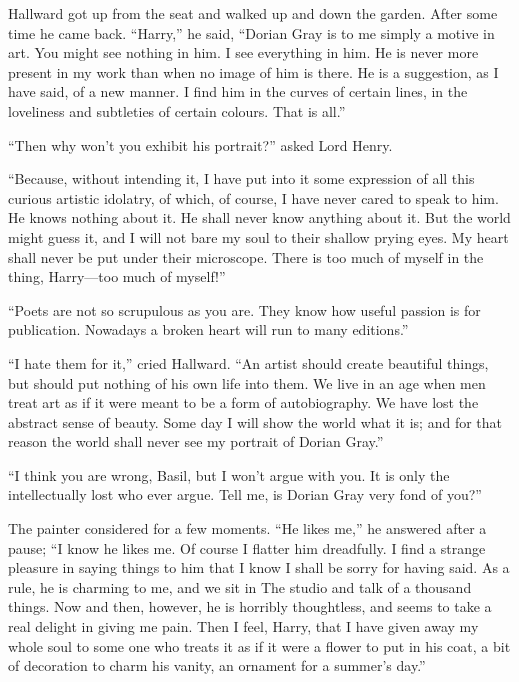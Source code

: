 Hallward got up from the seat and walked up and down the garden. After some time he came back. “Harry,” he said, “Dorian Gray is to me simply a motive in art. You might see nothing in him. I see everything in him. He is never more present in my work than when no image of him is there. He is a suggestion, as I have said, of a new manner. I find him in the curves of certain lines, in the loveliness and subtleties of certain colours. That is all.”

“Then why won’t you exhibit his portrait?” asked Lord Henry.

“Because, without intending it, I have put into it some expression of all this curious artistic idolatry, of which, of course, I have never cared to speak to him. He knows nothing about it. He shall never know anything about it. But the world might guess it, and I will not bare my soul to their shallow prying eyes. My heart shall never be put under their microscope. There is too much of myself in the thing, Harry—too much of myself!”

“Poets are not so scrupulous as you are. They know how useful passion is for publication. Nowadays a broken heart will run to many editions.”

“I hate them for it,” cried Hallward. “An artist should create beautiful things, but should put nothing of his own life into them. We live in an age when men treat art as if it were meant to be a form of autobiography. We have lost the abstract sense of beauty. Some day I will show the world what it is; and for that reason the world shall never see my portrait of Dorian Gray.”

“I think you are wrong, Basil, but I won’t argue with you. It is only the intellectually lost who ever argue. Tell me, is Dorian Gray very fond of you?”

The painter considered for a few moments. “He likes me,” he answered after a pause; “I know he likes me. Of course I flatter him dreadfully. I find a strange pleasure in saying things to him that I know I shall be sorry for having said. As a rule, he is charming to me, and we sit in The studio and talk of a thousand things. Now and then, however, he is horribly thoughtless, and seems to take a real delight in giving me pain. Then I feel, Harry, that I have given away my whole soul to some one who treats it as if it were a flower to put in his coat, a bit of decoration to charm his vanity, an ornament for a summer’s day.”

